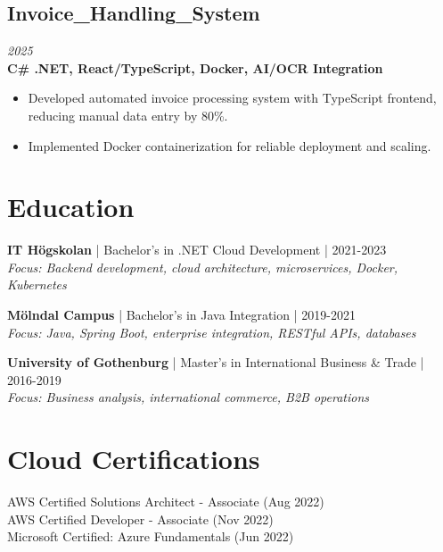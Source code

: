 \documentclass[10pt,a4paper]{article}
\begin{document}
\subsection*{Invoice\_Handling\_System}
\textit{2025} \\
\textbf{C\# .NET, React/TypeScript, Docker, AI/OCR Integration}
\begin{itemize}[noitemsep]
\item Developed automated invoice processing system with TypeScript frontend, reducing manual data entry by 80\%.
\item Implemented Docker containerization for reliable deployment and scaling.
\end{itemize}

\section*{Education}

\textbf{IT Högskolan} | Bachelor's in .NET Cloud Development | 2021-2023\\
\textit{Focus: Backend development, cloud architecture, microservices, Docker, Kubernetes}

\textbf{Mölndal Campus} | Bachelor's in Java Integration | 2019-2021\\
\textit{Focus: Java, Spring Boot, enterprise integration, RESTful APIs, databases}

\textbf{University of Gothenburg} | Master's in International Business \& Trade | 2016-2019\\
\textit{Focus: Business analysis, international commerce, B2B operations}

\section*{Cloud Certifications}
AWS Certified Solutions Architect - Associate (Aug 2022) \\
AWS Certified Developer - Associate (Nov 2022) \\
Microsoft Certified: Azure Fundamentals (Jun 2022)
\end{document}

